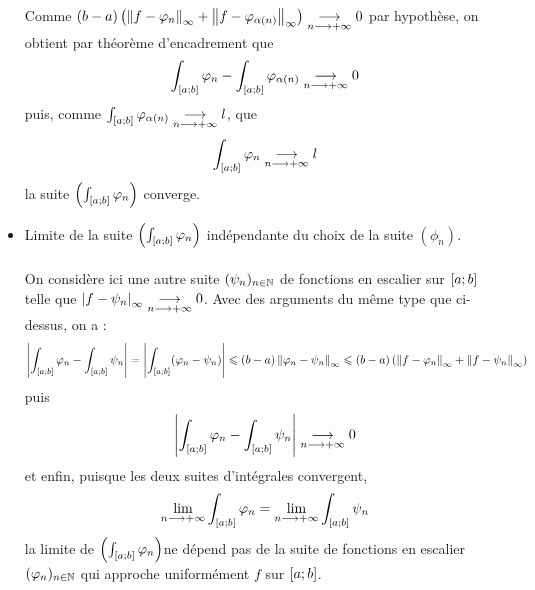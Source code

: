 \begin{dem}
\begin{itemize}
            Comme \((b - a) \left(\left\|f - \varphi_n\right\|_{\infty} + \left\|f - \varphi_{\alpha (n)}\right\|_{\infty}\right) \underset{n\longrightarrow+\infty}{\longrightarrow} 0\) par hypothèse, on obtient par théorème d’encadrement que 
            \[\int_{\left[a;b\right]} \varphi_n - \int_{\left[a;b\right]} \varphi_{\alpha (n)} \underset{n\longrightarrow+\infty}{\longrightarrow} 0\]
            puis, comme \(\int_{\left[a;b\right]} \varphi_{\alpha (n)} \underset{n\longrightarrow+\infty}{\longrightarrow} l\), que
            \[\int_{\left[a;b\right]} \varphi_n \underset{n\longrightarrow+\infty}{\longrightarrow} l\]
            \conclusion la suite \(\left(\int_{\left[a;b\right]} \varphi_n\right)\) converge.
        \item Limite de la suite \(\left(\int_{\left[a;b\right]} \varphi_n\right)\) indépendante du choix de la suite \((\phi_n)\).\\~\\
            On considère ici une autre suite \((\psi_n)_{n\in\mathbb{N}}\) de fonctions en escalier sur \(\left[a;b\right]\) telle que \(\left\lvert f - \psi_n\right\rvert_{\infty} \underset{n\longrightarrow+\infty}{\longrightarrow} 0\).
            Avec des arguments du même type que ci-dessus, on a :
            \[\left\lvert\int_{\left[a;b\right]}\varphi_n - \int_{\left[a;b\right]} \psi_n\right\rvert = \left\lvert\int_{\left[a;b\right]} (\varphi_n - \psi_n)\right\rvert\leqslant (b - a) \left\|\varphi_n - \psi_n\right\|_{\infty} \leqslant (b - a)\left(\left\|f - \varphi_n\right\|_{\infty} + \left\|f - \psi_n\right\|_{\infty}\right)\]
            puis 
            \[\left\lvert\int_{\left[a;b\right]} \varphi_n -\int_{\left[a;b\right]}\psi_n \right\rvert\underset{n\longrightarrow+\infty}{\longrightarrow} 0\]
            et enfin, puisque les deux suites d’intégrales convergent,
            \[\lim_{n\longrightarrow+\infty}\int_{\left[a;b\right]}\varphi_n = \lim_{n\longrightarrow+\infty} \int_{\left[a;b\right]}\psi_n\]
            \conclusion la limite de \(\left(\int_{\left[a;b\right]}\varphi_n\right) \)ne dépend pas de la suite de fonctions en escalier \((\varphi_n)_{n\in\mathbb{N}}\) qui approche uniformément \(f\) sur \(\left[a;b\right]\).
    \end{itemize}
\end{dem}
